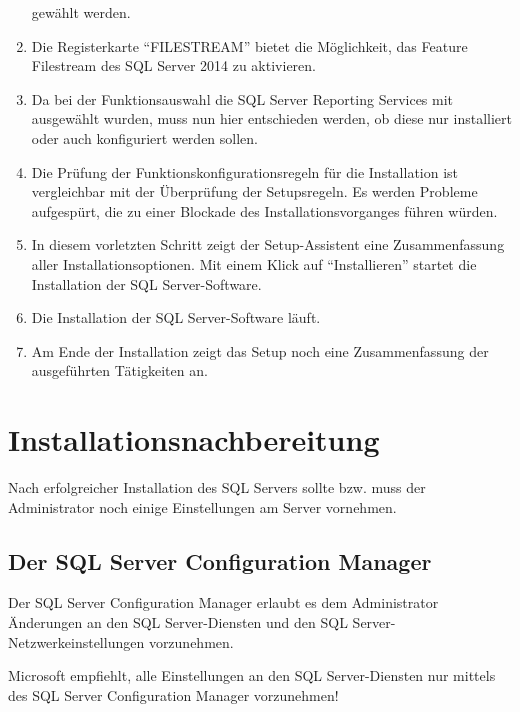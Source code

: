 \begin{enumerate}
          gewählt werden.
\clearpage
          \item Die Registerkarte \enquote{FILESTREAM} bietet die Möglichkeit, das
          Feature Filestream des SQL Server 2014 zu aktivieren.
          \item Da bei der Funktionsauswahl die SQL Server Reporting Services
          mit ausgewählt wurden, muss nun hier entschieden werden, ob diese nur
          installiert oder auch konfiguriert werden sollen.
          \item Die Prüfung der Funktionskonfigurationsregeln für die
          Installation ist vergleichbar mit der Überprüfung der Setupsregeln. Es werden Probleme
          aufgespürt, die zu einer Blockade des Installationsvorganges führen
          würden.
          \item In diesem vorletzten Schritt zeigt der Setup-Assistent eine
          Zusammenfassung aller Installationsoptionen. Mit einem Klick auf
          \enquote{Installieren} startet die Installation der SQL Server-Software.
\clearpage
          \item Die Installation der SQL Server-Software läuft.
          \item Am Ende der Installation zeigt das Setup noch eine
          Zusammenfassung der ausgeführten Tätigkeiten an.
        \end{enumerate}
    \section{Installationsnachbereitung}
      Nach erfolgreicher Installation des SQL Servers sollte bzw. muss der
      Administrator noch einige Einstellungen am Server vornehmen.
      \subsection{Der SQL Server Configuration Manager}
        Der SQL Server Configuration Manager erlaubt es dem Administrator
        Änderungen an den SQL Server-Diensten und den SQL
        Server-Netzwerkeinstellungen vorzunehmen.
        \begin{merke}
          Microsoft empfiehlt, alle Einstellungen an den SQL Server-Diensten nur
          mittels des SQL Server Configuration Manager vorzunehmen!
        \end{merke}

